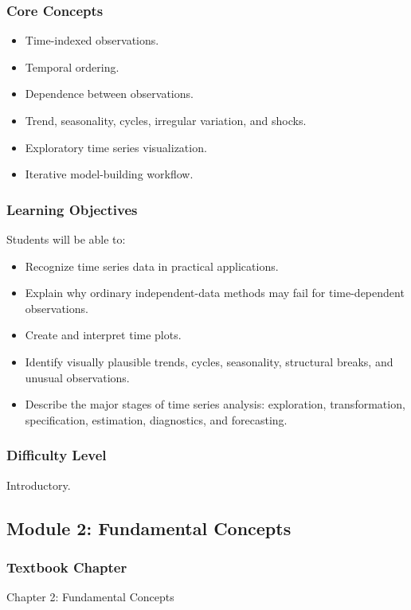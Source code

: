\documentclass[11pt]{article}
\begin{document}
\subsubsection*{Core Concepts}
\begin{itemize}
    \item Time-indexed observations.
    \item Temporal ordering.
    \item Dependence between observations.
    \item Trend, seasonality, cycles, irregular variation, and shocks.
    \item Exploratory time series visualization.
    \item Iterative model-building workflow.
\end{itemize}

\subsubsection*{Learning Objectives}
Students will be able to:
\begin{itemize}
    \item Recognize time series data in practical applications.
    \item Explain why ordinary independent-data methods may fail for time-dependent observations.
    \item Create and interpret time plots.
    \item Identify visually plausible trends, cycles, seasonality, structural breaks, and unusual observations.
    \item Describe the major stages of time series analysis: exploration, transformation, specification, estimation, diagnostics, and forecasting.
\end{itemize}

\subsubsection*{Difficulty Level}
Introductory.

\subsection{Module 2: Fundamental Concepts}

\subsubsection*{Textbook Chapter}
Chapter 2: Fundamental Concepts
\end{document}
